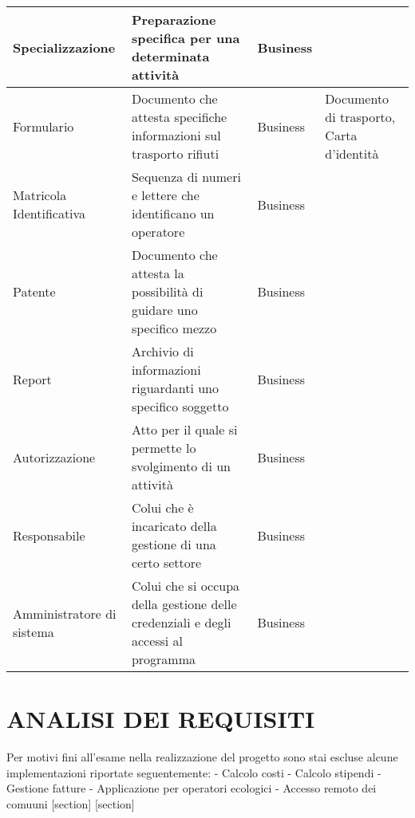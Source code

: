 \documentclass[green, fancy, 11pt]{elegantbook}
\begin{document}
{\begin{tabular}{|p{}|p{6cm}|l|p{4cm}|}
		\hline
		Specializzazione &Preparazione specifica per una determinata attività &Business& \\
		\hline
		Formulario &Documento che attesta specifiche informazioni sul trasporto rifiuti&Business &Documento di trasporto, Carta d'identità\\
		\hline
		Matricola Identificativa &Sequenza di numeri e lettere che identificano un operatore &Business&\\
		\hline
		Patente &Documento che attesta la possibilità di guidare uno specifico mezzo &Business&\\
		\hline
		Report &Archivio di informazioni riguardanti uno specifico soggetto &Business&\\
		\hline
		Autorizzazione &Atto per il quale si permette lo svolgimento di un attività &Business&\\
		\hline
		Responsabile &Colui che è incaricato della gestione di una certo settore&Business&\\
		\hline
		Amministratore di sistema &Colui che si occupa della gestione delle credenziali e degli accessi al programma &Business&\\
		\hline 
	\end{tabular}
}
\newpage

\chapter{ANALISI DEI REQUISITI}
Per motivi fini all'esame nella realizzazione del progetto sono stai escluse alcune implementazioni riportate seguentemente:
- Calcolo costi
- Calcolo stipendi
- Gestione fatture
- Applicazione per operatori ecologici
- Accesso remoto dei comuuni
[section]
[section]
\end{document}
